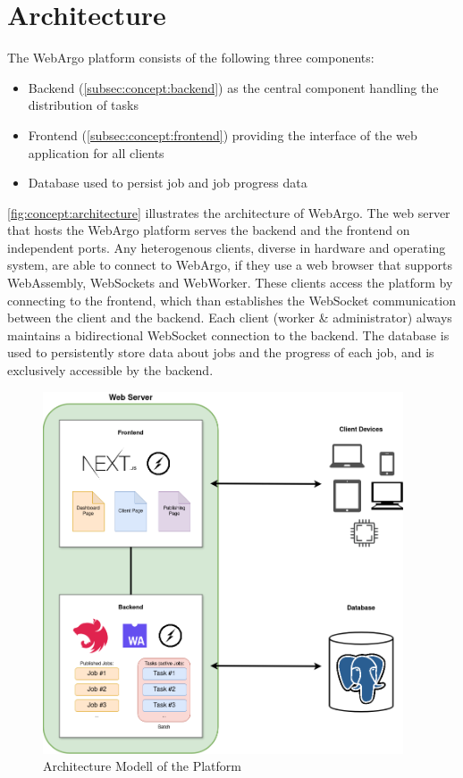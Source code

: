 \section{Architecture}
\label{sec:concept:architecture}
The WebArgo platform consists of the following three components:
\begin{itemize}
    \item Backend (\autoref{subsec:concept:backend}) as the central component handling the distribution of tasks
    \item Frontend (\autoref{subsec:concept:frontend}) providing the interface of the web application for all clients
    \item Database used to persist job and job progress data
\end{itemize}
\autoref{fig:concept:architecture} illustrates the architecture of WebArgo. The web server that hosts the WebArgo platform serves the backend and the frontend on independent ports. Any heterogenous clients, diverse in hardware and operating system, are able to connect to WebArgo, if they use a web browser that supports WebAssembly, WebSockets and WebWorker. These clients access the platform by connecting to the frontend, which than establishes the WebSocket communication between the client and the backend. Each client (worker \& administrator) always maintains a bidirectional WebSocket connection to the backend. The database is used to persistently store data about jobs and the progress of each job, and is exclusively accessible by the backend.
\begin{figure}[htbp]
    \centering
    \includegraphics[width=0.95\textwidth]{gfx/figures/WebAssembly-MA.png}
    \caption{Architecture Modell of the Platform}
    \label{fig:concept:architecture}
\end{figure}

